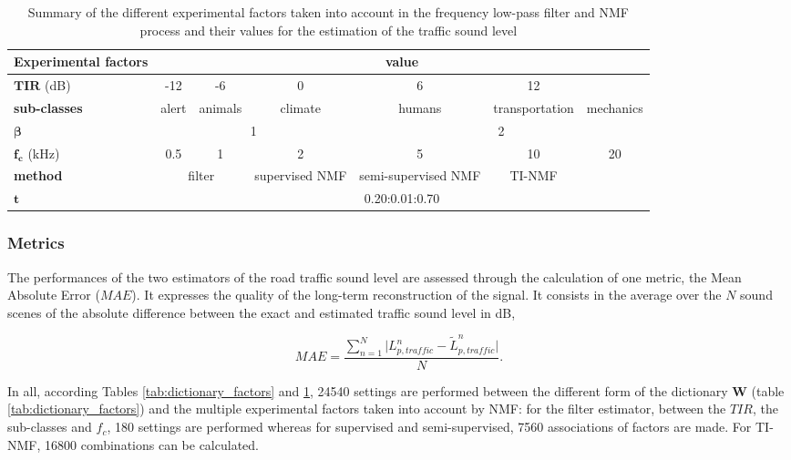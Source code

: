 \documentclass[twocolumn,a4paper,10pt]{article}
\begin{document}
\begin{table}[]
\centering
\begin{tabular}{lcccccc}
\textbf{Experimental factors} &  \multicolumn{6}{c}{value}\\ \hline
$\mathbf{TIR}$ (dB) & -12 & -6 & 0 & 6 & 12 &  \\ \hline
\textbf{sub-classes} & alert & animals & climate & humans & transportation & mechanics \\ \hline
$\mathbf{\beta}$ & \multicolumn{3}{c}{1} & \multicolumn{3}{c}{2} \\ \hline
$\mathbf{f_c}$ (kHz) & 0.5 & 1 & 2 & 5 & 10 & 20 \\ \hline
\textbf{method} & \multicolumn{2}{c}{filter} & supervised NMF & semi-supervised NMF & TI-NMF \\ \hline
$\mathbf{t}$ & \multicolumn{6}{c}{0.20:0.01:0.70} \\ \hline
\end{tabular}
\caption{Summary of the different experimental factors taken into account in the frequency low-pass filter and NMF process and their values for the estimation of the traffic sound level}
\label{tab:estimation_factors}
\end{table}


\subsubsection{Metrics}
The performances of the two estimators of the road traffic sound level are assessed through the calculation of one metric, the Mean Absolute Error ($MAE$). It expresses the quality of the long-term reconstruction of the signal. It consists in the average over the $N$ sound scenes of the absolute difference between the exact and estimated traffic sound level in dB,

\begin{equation}
MAE = \frac{\sum_{n = 1}^N\vert L^n_{p,traffic}-\tilde{L}^n_{p,traffic} \vert}{N}.
\end{equation}

In all, according Tables \ref{tab:dictionary_factors} and \ref{tab:estimation_factors}, 24540 settings are performed between the different form of the dictionary $\mathbf{W}$ (table \ref{tab:dictionary_factors}) and the multiple experimental factors taken into account by NMF:  for the filter estimator, between the $TIR$, the sub-classes and $f_c$, 180 settings are performed whereas for supervised and semi-supervised, 7560 associations of factors are made. For TI-NMF, 16800 combinations can be calculated.
\end{document}
